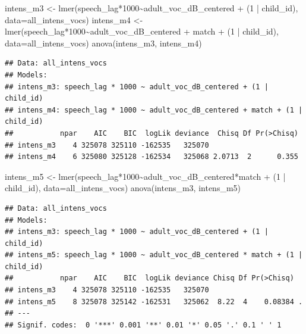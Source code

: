 \documentclass[
]{article}
\newenvironment{Shaded}{\begin{snugshade}}{\end{snugshade}}
\newcommand{\AttributeTok}[1]{\textcolor[rgb]{0.77,0.63,0.00}{#1}}
\newcommand{\DecValTok}[1]{\textcolor[rgb]{0.00,0.00,0.81}{#1}}
\newcommand{\FunctionTok}[1]{\textcolor[rgb]{0.00,0.00,0.00}{#1}}
\newcommand{\NormalTok}[1]{#1}
\newcommand{\OtherTok}[1]{\textcolor[rgb]{0.56,0.35,0.01}{#1}}
\newcommand{\SpecialCharTok}[1]{\textcolor[rgb]{0.00,0.00,0.00}{#1}}
\begin{document}
\begin{Shaded}
\begin{Highlighting}[]
\NormalTok{intens\_m3 }\OtherTok{\textless{}{-}} \FunctionTok{lmer}\NormalTok{(speech\_lag}\SpecialCharTok{*}\DecValTok{1000}\SpecialCharTok{\textasciitilde{}}\NormalTok{adult\_voc\_dB\_centered }\SpecialCharTok{+}\NormalTok{ (}\DecValTok{1} \SpecialCharTok{|}\NormalTok{ child\_id), }\AttributeTok{data=}\NormalTok{all\_intens\_vocs)}
\NormalTok{intens\_m4 }\OtherTok{\textless{}{-}} \FunctionTok{lmer}\NormalTok{(speech\_lag}\SpecialCharTok{*}\DecValTok{1000}\SpecialCharTok{\textasciitilde{}}\NormalTok{adult\_voc\_dB\_centered }\SpecialCharTok{+}\NormalTok{ match }\SpecialCharTok{+}\NormalTok{ (}\DecValTok{1} \SpecialCharTok{|}\NormalTok{ child\_id), }\AttributeTok{data=}\NormalTok{all\_intens\_vocs)}
\FunctionTok{anova}\NormalTok{(intens\_m3, intens\_m4)}
\end{Highlighting}
\end{Shaded}

\begin{verbatim}
## Data: all_intens_vocs
## Models:
## intens_m3: speech_lag * 1000 ~ adult_voc_dB_centered + (1 | child_id)
## intens_m4: speech_lag * 1000 ~ adult_voc_dB_centered + match + (1 | child_id)
##           npar    AIC    BIC  logLik deviance  Chisq Df Pr(>Chisq)
## intens_m3    4 325078 325110 -162535   325070                     
## intens_m4    6 325080 325128 -162534   325068 2.0713  2      0.355
\end{verbatim}

\begin{Shaded}
\begin{Highlighting}[]
\NormalTok{intens\_m5 }\OtherTok{\textless{}{-}} \FunctionTok{lmer}\NormalTok{(speech\_lag}\SpecialCharTok{*}\DecValTok{1000}\SpecialCharTok{\textasciitilde{}}\NormalTok{adult\_voc\_dB\_centered}\SpecialCharTok{*}\NormalTok{match }\SpecialCharTok{+}\NormalTok{ (}\DecValTok{1} \SpecialCharTok{|}\NormalTok{ child\_id), }\AttributeTok{data=}\NormalTok{all\_intens\_vocs)}
\FunctionTok{anova}\NormalTok{(intens\_m3, intens\_m5)}
\end{Highlighting}
\end{Shaded}

\begin{verbatim}
## Data: all_intens_vocs
## Models:
## intens_m3: speech_lag * 1000 ~ adult_voc_dB_centered + (1 | child_id)
## intens_m5: speech_lag * 1000 ~ adult_voc_dB_centered * match + (1 | child_id)
##           npar    AIC    BIC  logLik deviance Chisq Df Pr(>Chisq)  
## intens_m3    4 325078 325110 -162535   325070                      
## intens_m5    8 325078 325142 -162531   325062  8.22  4    0.08384 .
## ---
## Signif. codes:  0 '***' 0.001 '**' 0.01 '*' 0.05 '.' 0.1 ' ' 1
\end{verbatim}
\end{document}
